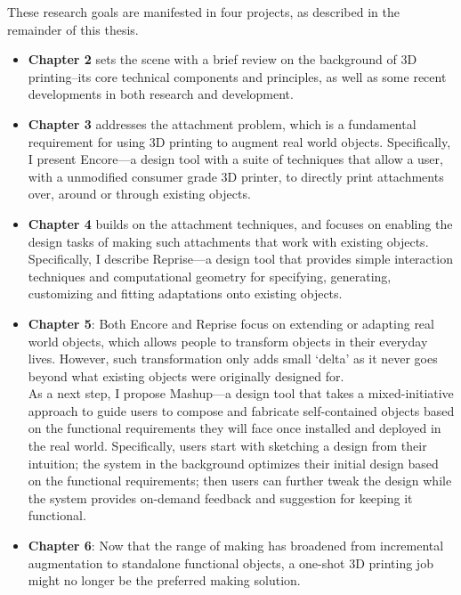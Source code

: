 These research goals are manifested in four projects, as described in the remainder of this thesis.

\begin{itemize}
  \item \textbf{Chapter 2} sets the scene with a brief review on the background of 3D printing--its core technical components and principles, as well as some recent developments in both research and development.
  \item \textbf{Chapter 3} addresses the attachment problem, which is a fundamental requirement for using 3D printing to augment real world objects. Specifically, I present Encore---a design tool with a suite of techniques that allow a user, with a unmodified consumer grade 3D printer, to directly print attachments over, around or through existing objects.
  \item \textbf{Chapter 4} builds on the attachment techniques, and focuses on enabling the design tasks of making such attachments that work with existing objects. Specifically, I describe Reprise---a design tool that provides simple interaction techniques and computational geometry for specifying, generating, customizing and fitting adaptations onto existing objects.

  \item \textbf{Chapter 5}: Both Encore and Reprise focus on extending or adapting real world objects, which allows people to transform objects in their everyday lives. However, such transformation only adds small `delta' as it never goes beyond what existing objects were originally designed for.
  \\
  As a next step, I propose Mashup---a design tool that takes a mixed-initiative approach to guide users to compose and fabricate self-contained objects based on the functional requirements they will face once installed and deployed in the real world. Specifically, users start with sketching a design from their intuition; the system in the background optimizes their initial design based on the functional requirements; then users can further tweak the design while the system provides on-demand feedback and suggestion for keeping it functional.

  \item \textbf{Chapter 6}: Now that the range of making has broadened from incremental augmentation to standalone functional objects, a one-shot 3D printing job might no longer be the preferred making solution.


\end{itemize}
